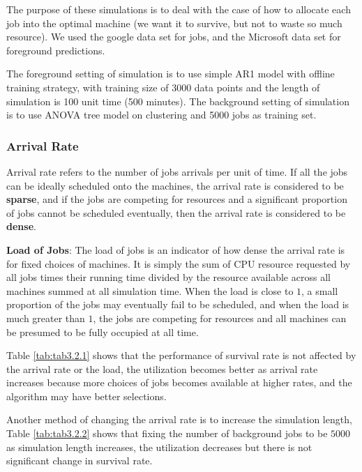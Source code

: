 \documentclass{article}
\begin{document}
\begin{flushleft}
The purpose of these simulations is to deal with the case of how to allocate
each job into the optimal machine (we want it to survive, but not to waste so
much resource). We used the google data set for jobs, and the Microsoft data set
for foreground predictions.
\end{flushleft}

\begin{flushleft}
The foreground setting of simulation is to use simple AR1 model with offline
training strategy, with training size of 3000 data points and the length of
simulation is 100 unit time (500 minutes). The background setting of simulation
is to use ANOVA tree model on clustering and 5000 jobs as training set.
\end{flushleft}

\subsubsection{Arrival Rate}

\begin{flushleft}
Arrival rate refers to the number of jobs arrivals per unit of time. If all the
jobs can be ideally scheduled onto the machines, the arrival rate is considered
to be \textbf{sparse}, and if the jobs are competing for resources and a
significant proportion of jobs cannot be scheduled eventually, then the arrival
rate is considered to be \textbf{dense}.

\textbf{Load of Jobs}: The load of jobs is an indicator of how dense the arrival
rate is for fixed choices of machines. It is simply the sum of CPU resource
requested by all jobs times their running time divided by the resource available
across all machines summed at all simulation time. When the load is close to
$1$, a small proportion of the jobs may eventually fail to be scheduled, and
when the load is much greater than $1$, the jobs are competing for resources and
all machines can be presumed to be fully occupied at all time.

Table \ref{tab:tab3.2.1} shows that the performance of survival rate is not
affected by the arrival rate or the load, the utilization becomes better as
arrival rate increases because more choices of jobs becomes available at higher
rates, and the algorithm may have better selections.

Another method of changing the arrival rate is to increase the simulation
length, Table \ref{tab:tab3.2.2} shows that fixing the number of background jobs
to be $5000$ as simulation length increases, the utilization decreases but there
is not significant change in survival rate.
\end{flushleft}
\end{document}
